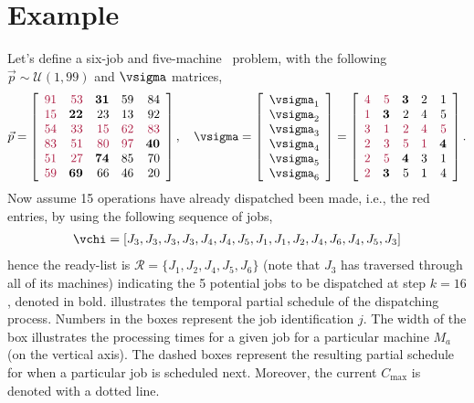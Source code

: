 \section{Example}\label{sec:jsp:example}
Let's define a six-job and five-machine \jsp\ problem, with the following $\vec{p}\sim\mathcal{U}(1,99)$ and $\vsigma$ matrices,
\begin{eqnarray}
\vec{p}=
\left[\begin{array}{rrrrr}
 \tcr{91} & \tcr{53} & \textbf{31} & 59 & 84 \\
 \tcr{15} & \textbf{22} & 23 & 13 & 92 \\
 \tcr{54} & \tcr{33} & \tcr{15} & \tcr{62} & \tcr{83} \\
 \tcr{83} & \tcr{51} & \tcr{80} & \tcr{97} & \textbf{40} \\
 \tcr{51} & \tcr{27} & \textbf{74} & 85 & 70 \\
 \tcr{59} & \textbf{69} & 66 & 46 & 20 
\end{array}\right], 
\quad \label{eq:psigma}
\vsigma=
\left[\begin{array}{r}
\vsigma_1 \\ \vsigma_2  \\ \vsigma_3 \\ \vsigma_4 \\ \vsigma_5 \\ \vsigma_6
\end{array}\right] =
\left[\begin{array}{rrrrr} 
 \tcr{4} & \tcr{5} & \textbf{3} & 2 & 1 \\
 \tcr{1} & \textbf{3} & 2 & 4 & 5 \\
 \tcr{3} & \tcr{1} & \tcr{2} & \tcr{4} & \tcr{5} \\
 \tcr{2} & \tcr{3} & \tcr{5} & \tcr{1} & \textbf{4} \\
 \tcr{2} & \tcr{5} & \textbf{4} & 3 & 1 \\
 \tcr{2} & \textbf{3} & 5 & 1 & 4 
\end{array}\right].
\end{eqnarray}
Now assume 15 operations have already dispatched been made, i.e., the red entries, by using the following sequence of jobs,
\begin{eqnarray}
\vchi=\left[J_3,J_3,J_3,J_3,J_4,J_4,J_5,J_1,J_1,J_2,J_4,J_6,J_4,J_5,J_3\right]
\end{eqnarray}
hence the ready-list is $\mathcal{R}=\{J_1,J_2,J_4,J_5,J_6\}$ (note that $J_3$ has traversed through all of its machines) indicating the 5 potential jobs to be dispatched at step $k=16$, denoted in bold.  illustrates the temporal partial schedule of the dispatching process.
Numbers in the boxes represent the job identification $j$. The width of the box illustrates the processing times for a given job for a particular machine $M_a$ (on the vertical axis). The dashed boxes represent the resulting partial schedule for when a particular job is scheduled next. Moreover, the current $C_{\max}$ is denoted with a dotted line.

